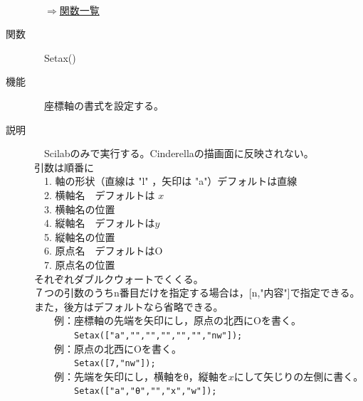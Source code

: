 \documentclass[papersize,a4paper,12pt,uplatex]{jsarticle}
\begin{document}
\begin{description}
\\

\begin{flushright}　\hyperlink{functionlist}{$\Rightarrow$関数一覧}\end{flushright}
\newpage
\hypertarget{setax}{}
\item[関数]　Setax()
\item[機能]　座標軸の書式を設定する。
\item[説明]　Scilabのみで実行する。Cinderellaの描画面に反映されない。\\
引数は順番に\\
　1. 軸の形状（直線は "l" ，矢印は "a"）デフォルトは直線\\
　2. 横軸名　デフォルトは $x$ \\
　3. 横軸名の位置\\
　4. 縦軸名　デフォルトは$y$\\
　5. 縦軸名の位置\\
　6. 原点名　デフォルトはO\\
　7. 原点名の位置\\
それぞれダブルクウォートでくくる。\\
７つの引数のうちn番目だけを指定する場合は，[n,"内容"]で指定できる。\\
また，後方はデフォルトなら省略できる。\\

　　例：座標軸の先端を矢印にし，原点の北西にOを書く。\\
　　　　\verb|Setax(["a","","","","","","nw"]);|\\

　　例：原点の北西にOを書く。\\
　　　　\verb|Setax([7,"nw"]);|\\

　　例：先端を矢印にし，横軸をθ，縦軸を$x$にして矢じりの左側に書く。\\
　　　　\verb|Setax(["a","θ","","x","w"]);|\\
　\\
　　　　　
　\\


\end{description}
\end{document}
